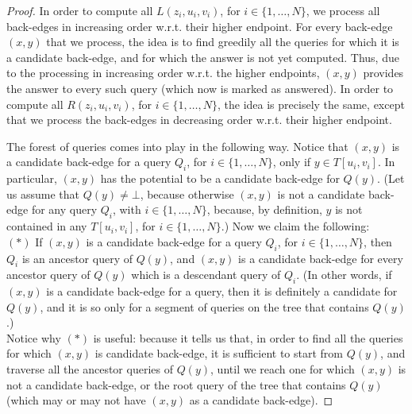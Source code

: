 \documentclass[11pt,a4paper]{article}
\begin{document}
\begin{proof}
In order to compute all $L(z_i,u_i,v_i)$, for $i\in\{1,\dots,N\}$, we process all back-edges in increasing order w.r.t. their higher endpoint. For every back-edge $(x,y)$ that we process, the idea is to find greedily all the queries for which it is a candidate back-edge, and for which the answer is not yet computed. Thus, due to the processing in increasing order w.r.t. the higher endpoints, $(x,y)$ provides the answer to every such query (which now is marked as answered). In order to compute all $R(z_i,u_i,v_i)$, for $i\in\{1,\dots,N\}$, the idea is precisely the same, except that we process the back-edges in decreasing order w.r.t. their higher endpoint.



The forest of queries comes into play in the following way. Notice that $(x,y)$ is a candidate back-edge for a query $Q_i$, for $i\in\{1,\dots,N\}$, only if $y\in T[u_i,v_i]$. In particular, $(x,y)$ has the potential to be a candidate back-edge for $Q(y)$. (Let us assume that $Q(y)\neq\bot$, because otherwise $(x,y)$ is not a candidate back-edge for any query $Q_i$, with $i\in\{1,\dots,N\}$, because, by definition, $y$ is not contained in any $T[u_i,v_i]$, for $i\in\{1,\dots,N\}$.) Now we claim the following:\\

$(*)$ If $(x,y)$ is a candidate back-edge for a query $Q_i$, for $i\in\{1,\dots,N\}$, then $Q_i$ is an ancestor query of $Q(y)$, and $(x,y)$ is a candidate back-edge for every ancestor query of $Q(y)$ which is a descendant query of $Q_i$. (In other words, if $(x,y)$ is a candidate back-edge for a query, then it is definitely a candidate for $Q(y)$, and it is so only for a segment of queries on the tree that contains $Q(y)$.)\\

Notice why $(*)$ is useful: because it tells us that, in order to find all the queries for which $(x,y)$ is candidate back-edge, it is sufficient to start from $Q(y)$, and traverse all the ancestor queries of $Q(y)$, until we reach one for which $(x,y)$ is not a candidate back-edge, or the root query of the tree that contains $Q(y)$ (which may or may not have $(x,y)$ as a candidate back-edge).


\end{proof}
\end{document}
